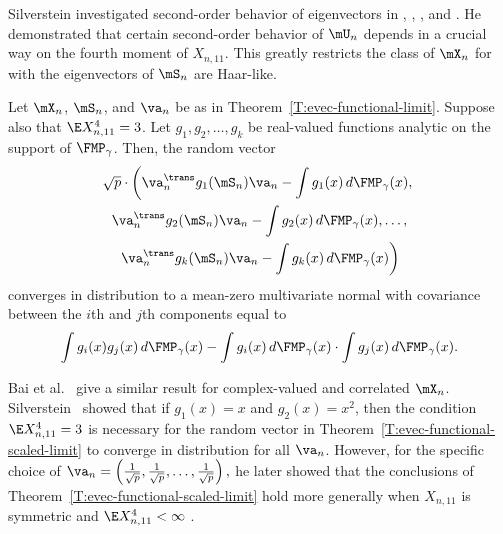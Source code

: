 Silverstein investigated second-order behavior of eigenvectors in \cite{silverstein1981dbe}, \cite{silverstein1984slt}, \cite{silverstein1989eld}, and \cite{silverstein1990wcr}.  He demonstrated that certain second-order behavior of $\mU_n$ depends in a crucial way on the fourth moment of $X_{n,11}$.  This greatly restricts the class of $\mX_n$ for with the eigenvectors of $\mS_n$ are Haar-like.

\begin{theorem}\label{T:evec-functional-scaled-limit}
    Let $\mX_n$, $\mS_n$, and $\va_n$ be as in 
    Theorem~\ref{T:evec-functional-limit}. Suppose also that
    $\E X_{n,11}^4 = 3$.  Let $g_1, g_2, \ldots, g_k$
    be real-valued functions analytic on the support of $\FMP_\gamma$.  
    Then, the random vector
    \begin{multline*}
        \sqrt{p} \cdot
        \left(
            \va_n^\trans g_1( \mS_n ) \va_n
            -
            \int g_1(x) \, d\FMP_\gamma(x), \right. \\
            \va_n^\trans g_2( \mS_n ) \va_n
            -
            \int g_2(x) \, d\FMP_\gamma(x),
            \ldots, \\ \left.
            \va_n^\trans g_k( \mS_n ) \va_n
            -
            \int g_k(x) \, d\FMP_\gamma(x)
        \right)
    \end{multline*}
    converges in distribution to a mean-zero multivariate normal with
    covariance between the $i$th and $j$th components equal to
    \[
        \int
            g_i(x) g_j(x) \, d\FMP_\gamma(x)
        -
        \int
            g_i(x) \, d\FMP_\gamma(x)
        \cdot
        \int
            g_j(x) \, d\FMP_\gamma(x).
    \]
\end{theorem}

\noindent
Bai et al.~\cite{bai2007ael} give a similar result for complex-valued and correlated $\mX_n$.  Silverstein~\cite{silverstein1989eld} showed that if $g_1(x) = x$ and $g_2(x) = x^2$, then the condition $\E X_{n,11}^4 = 3$ is necessary for the random vector in Theorem~\ref{T:evec-functional-scaled-limit} to converge in distribution for all $\va_n$.  However, for the specific choice of
\(
    \va_n
    =
    \left(
        \frac{1}{\sqrt{p}},
        \frac{1}{\sqrt{p}},
        \ldots,        
        \frac{1}{\sqrt{p}}        
    \right),
\)
he later showed that the conclusions of Theorem~\ref{T:evec-functional-scaled-limit} hold more generally when $X_{n,11}$ is symmetric and $\E X_{n,11}^4 < \infty$ \cite{silverstein1990wcr}.  
